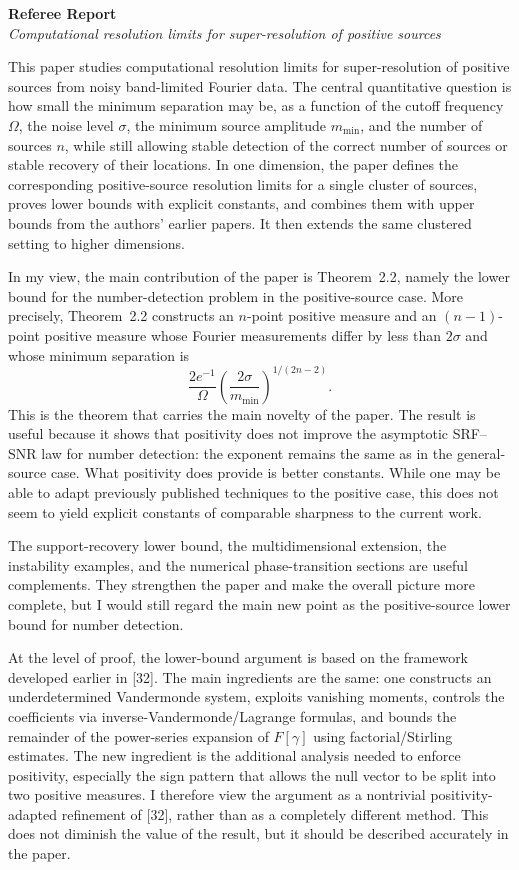 \documentclass[11pt]{article}
\begin{document}
\begin{center}
{\Large \textbf{Referee Report}}\\[0.5em]
\textit{Computational resolution limits for super-resolution of positive sources}
\end{center}

This paper studies computational resolution limits for super-resolution of positive sources from
noisy band-limited Fourier data. The central quantitative question is how small the minimum
separation may be, as a function of the cutoff frequency $\Omega$, the noise level $\sigma$,
the minimum source amplitude $m_{\min}$, and the number of sources $n$, while still allowing
stable detection of the correct number of sources or stable recovery of their locations.
In one dimension, the paper defines the corresponding positive-source resolution limits for a
single cluster of sources, proves lower bounds with explicit constants, and combines them
with upper bounds from the authors' earlier papers. It then extends the same clustered setting
to higher dimensions.

In my view, the main contribution of the paper is Theorem~2.2, namely the lower bound for the
number-detection problem in the positive-source case. More precisely, Theorem~2.2 constructs an
$n$-point positive measure and an $(n-1)$-point positive measure whose Fourier measurements
differ by less than $2\sigma$ and whose minimum separation is
\[
\frac{2e^{-1}}{\Omega}\left(\frac{2\sigma}{m_{\min}}\right)^{\!1/(2n-2)}.
\]
This is the theorem that carries the main novelty of the paper. The result is useful because it
shows that positivity does not improve the asymptotic SRF--SNR law for number detection: the
exponent remains the same as in the general-source case. What positivity does provide is better
constants. While one may be able to adapt previously published techniques to the positive case,
this does not seem to yield explicit constants of comparable sharpness to the current work.

The support-recovery lower bound, the multidimensional extension, the instability examples, and
the numerical phase-transition sections are useful complements. They strengthen the paper and make
the overall picture more complete, but I would still regard the main new point as the
positive-source lower bound for number detection.

At the level of proof, the lower-bound argument is based on the framework developed earlier in
[32]. The main ingredients are the same: one constructs an underdetermined Vandermonde system,
exploits vanishing moments, controls the coefficients via inverse-Vandermonde/Lagrange formulas,
and bounds the remainder of the power-series expansion of $F[\gamma]$ using
factorial/Stirling estimates. The new ingredient is the additional analysis needed to enforce
positivity, especially the sign pattern that allows the null vector to be split into two positive
measures. I therefore view the argument as a nontrivial positivity-adapted refinement of [32],
rather than as a completely different method. This does not diminish the value of the result, but
it should be described accurately in the paper.
\end{document}
